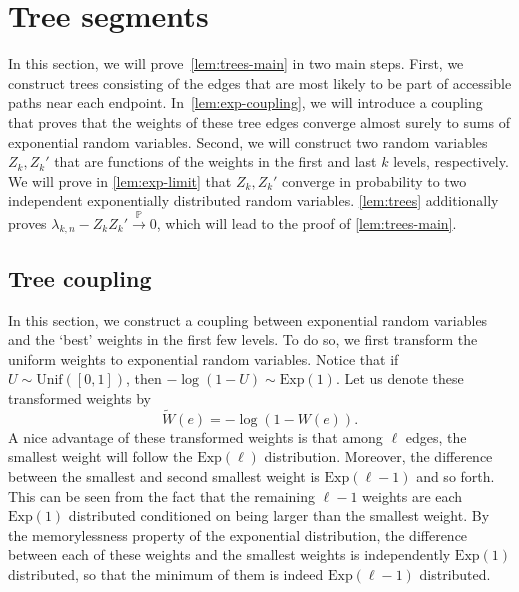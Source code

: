 \documentclass[11pt]{article}
\theoremstyle{definition}
\theoremstyle{remark}
\theoremstyle{remark}
\numberwithin{theorem}{section}
\providecommand{\P}{}
\renewcommand{\P}{\mathbb{P}}
\begin{document}
\section{Tree segments}\label{sec:trees}

In this section, we will prove~\cref{lem:trees-main} in two main steps. First, we construct trees consisting of the edges that are most likely to be part of accessible paths near each endpoint. In~\cref{lem:exp-coupling}, we will introduce a coupling that proves that the weights of these tree edges converge almost surely to sums of exponential random variables. Second, we will construct two random variables $Z_k,Z_k'$ that are functions of the weights in the first and last $k$ levels, respectively. We will prove in \cref{lem:exp-limit} that $Z_k,Z_k'$ converge in probability to two independent exponentially distributed random variables. \cref{lem:trees} additionally proves $\lambda_{k,n}-Z_kZ_k'\stackrel{\P}\to0$, which will lead to the proof of \cref{lem:trees-main}.

\subsection{Tree coupling}

In this section, we construct a coupling between exponential random variables and the `best' weights in the first few levels. To do so, we first transform the uniform weights to exponential random variables. Notice that if $U\sim\text{Unif}([0,1])$, then
\(
-\log(1-U)\sim\text{Exp}(1).
\)
Let us denote these transformed weights by
\begin{equation}\label{eq:exp_transformation}
\widetilde{W}(e)=-\log(1-W(e)).
\end{equation}
A nice advantage of these transformed weights is that among $\ell$ edges, the smallest weight will follow the $\text{Exp}(\ell)$ distribution. Moreover, the difference between the smallest and second smallest weight is $\text{Exp}(\ell-1)$ and so forth. This can be seen from the fact that the remaining $\ell-1$ weights are each $\text{Exp}(1)$ distributed conditioned on being larger than the smallest weight. By the memorylessness property of the exponential distribution, the difference between each of these weights and the smallest weights is independently $\text{Exp}(1)$ distributed, so that the minimum of them is indeed $\text{Exp}(\ell-1)$ distributed.
\end{document}
